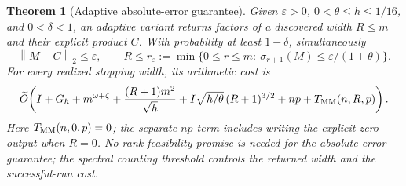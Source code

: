 \documentclass[11pt]{article}
\newtheorem{theorem}{Theorem}
\newcommand{\norm}[1]{\left\lVert#1\right\rVert}
\newcommand{\MM}{T_{\rm MM}}
\newcommand{\tO}{\widetilde O}
\begin{document}
\begin{theorem}[Adaptive absolute-error guarantee]\label{thm:absolute}
Given \(\varepsilon>0\), \(0<\theta\leq h\leq1/16\), and
\(0<\delta<1\), an adaptive variant returns factors of a discovered width
\(R\leq m\) and their explicit product \(C\). With probability at least
\(1-\delta\), simultaneously
\[
 \norm{M-C}_2\leq\varepsilon,\qquad
 R\leq r_\varepsilon:=
 \min\{0\leq r\leq m:\ \sigma_{r+1}(M)\leq
                                    \varepsilon/(1+\theta)\}.
\]
For every realized stopping width, its arithmetic cost is
\[
 \tO\!\left(I+G_h+m^{\omega+\zeta}
     +\frac{(R+1)m^2}{\sqrt h}
     +I\sqrt{h/\theta}\,(R+1)^{3/2}
     +np+\MM(n,R,p)\right).
\]
Here \(\MM(n,0,p)=0\); the separate \(np\) term includes writing
the explicit zero output when \(R=0\). No rank-feasibility promise is
needed for the absolute-error guarantee; the spectral counting threshold
controls the returned width and the successful-run cost.
\end{theorem}
\end{document}
